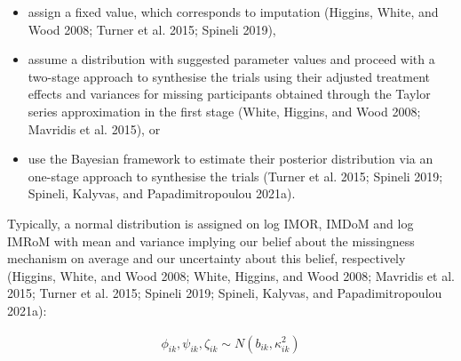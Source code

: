 \begin{itemize}
\tightlist
\item
  assign a fixed value, which corresponds to imputation (Higgins, White, and Wood 2008; Turner et al. 2015; Spineli 2019),
\item
  assume a distribution with suggested parameter values and proceed with a two-stage
  approach to synthesise the trials using their adjusted treatment effects and variances
  for missing participants obtained through the Taylor series approximation in the
  first stage (White, Higgins, and Wood 2008; Mavridis et al. 2015), or
\item
  use the Bayesian framework to estimate their posterior distribution via an one-stage
  approach to synthesise the trials (Turner et al. 2015; Spineli 2019; Spineli, Kalyvas, and Papadimitropoulou 2021a).
\end{itemize}

Typically, a normal distribution is assigned on log IMOR, IMDoM and log IMRoM with
mean and variance implying our belief about the missingness mechanism on average
and our uncertainty about this belief, respectively (Higgins, White, and Wood 2008; White, Higgins, and Wood 2008; Mavridis et al. 2015; Turner et al. 2015; Spineli 2019; Spineli, Kalyvas, and Papadimitropoulou 2021a):

\[\begin{aligned}
\phi_{ik}, \psi_{ik}, \zeta_{ik} \sim N(b_{ik}, \kappa^{2}_{ik})
\end{aligned}\]

